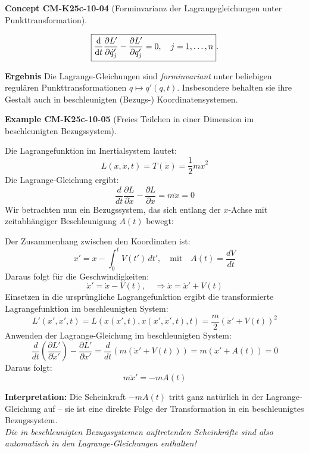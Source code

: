 \documentclass[10pt, letterpaper]{article}
\newcommand{\CustomHeading}[3]{%
  \par\medskip\noindent%
  \textbf{#1 #2} \textnormal{(#3)}.\enskip%
}
\newenvironment{EXA}[2]{\CustomHeading{Example}{#1}{#2}}{}
\newenvironment{CONC}[2]{\CustomHeading{Concept}{#1}{#2}}{}
\begin{document}
\begin{CONC}{CM-K25c-10-04}{Forminvarianz der Lagrangegleichungen unter Punkttransformation}
\[
  \boxed{%
    \frac{\mathrm d}{\mathrm dt}
      \frac{\partial L'}{\partial\dot q'_j}
    -\frac{\partial L'}{\partial q'_j}=0,
    \quad j=1,\dots,n }.
\]

\textbf{Ergebnis}
Die Lagrange-Gleichungen sind \emph{forminvariant} unter beliebigen
regulären Punkttransformationen
\( q\mapsto q'(q,t) \).
Insbesondere behalten sie ihre Gestalt auch in beschleunigten
(Bezugs-) Koordinatensystemen.
\end{CONC}

\begin{EXA}{CM-K25c-10-05}{Freies Teilchen in einer Dimension im beschleunigten Bezugssystem}
Die Lagrangefunktion im Inertialsystem lautet:
\[
L(x,\dot{x},t) = T(\dot{x}) = \frac{1}{2} m \dot{x}^2
\]
Die Lagrange-Gleichung ergibt:
\[
\frac{d}{dt} \frac{\partial L}{\partial \dot{x}} - \frac{\partial L}{\partial x} = m \ddot{x} = 0
\]
Wir betrachten nun ein Bezugssystem, das sich entlang der \( x \)-Achse mit zeitabhängiger Beschleunigung \( A(t) \) bewegt:

\begin{center}
\end{center}

Der Zusammenhang zwischen den Koordinaten ist:
\[
x' = x - \int_0^t V(t') \, dt', 
\quad \text{mit} \quad A(t) = \frac{dV}{dt}
\]
Daraus folgt für die Geschwindigkeiten:
\[
\dot{x}' = \dot{x} - V(t), 
\quad \Rightarrow \dot{x} = \dot{x}' + V(t)
\]
Einsetzen in die ursprüngliche Lagrangefunktion ergibt die transformierte Lagrangefunktion im beschleunigten System:
\[
L'(x', \dot{x}', t) = L(x(x', t), \dot{x}(x', \dot{x}', t), t) = \frac{m}{2}(\dot{x}' + V(t))^2
\]
Anwenden der Lagrange-Gleichung im beschleunigten System:
\[
\frac{d}{dt} \left( \frac{\partial L'}{\partial \dot{x}'} \right) - \frac{\partial L'}{\partial x'} 
= \frac{d}{dt} \left( m (\dot{x}' + V(t)) \right) = m (\ddot{x}' + A(t)) = 0
\]
Daraus folgt:
\[
m \ddot{x}' = -m A(t)
\]

\noindent\textbf{Interpretation:}  
Die Scheinkraft \( -mA(t) \) tritt ganz natürlich in der Lagrange-Gleichung auf – sie ist eine direkte Folge der Transformation in ein beschleunigtes Bezugssystem.  
\\[1ex]
\textit{Die in beschleunigten Bezugssystemen auftretenden Scheinkräfte sind also automatisch in den Lagrange-Gleichungen enthalten!}
\end{EXA}
\end{document}
